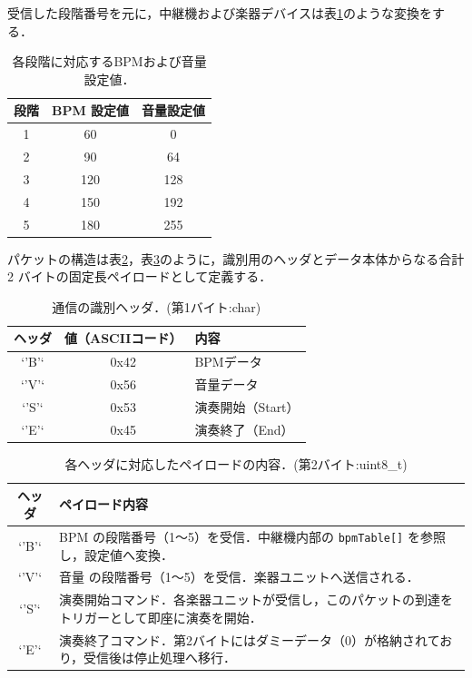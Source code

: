 \documentclass[uplatex,dvipdfmx]{jlreq}
\begin{document}
受信した段階番号を元に，中継機および楽器デバイスは表\ref{tab:bpm_volume}のような変換をする．
\begin{table}[H]
\centering
\caption{各段階に対応するBPMおよび音量設定値．}
\label{tab:bpm_volume}
\begin{tabular}{c|c|c}
\hline
段階 & BPM 設定値 & 音量設定値 \\ \hline
1 & 60 & 0 \\ \hline
2 & 90 & 64 \\ \hline
3 & 120 & 128 \\ \hline
4 & 150 & 192 \\ \hline
5 & 180 & 255 \\ \hline
\end{tabular}
\end{table}

パケットの構造は表\ref{tab:hed}，表\ref{tab:payload}のように，識別用のヘッダとデータ本体からなる合計2 バイトの固定長ペイロードとして定義する．
\begin{table}[H]
\centering
\caption{通信の識別ヘッダ．(第1バイト:char)}
\label{tab:hed}
\begin{tabular}{c|c|l}
\hline
ヘッダ & 値（ASCIIコード） & 内容 \\ \hline
`'B'` & 0x42 & BPMデータ \\ \hline
`'V'` & 0x56 & 音量データ \\ \hline
`'S'` & 0x53 & 演奏開始（Start） \\ \hline
`'E'` & 0x45 & 演奏終了（End） \\ \hline
\end{tabular}
\end{table}

\begin{table}[H]
\centering
\caption{各ヘッダに対応したペイロードの内容．(第2バイト:uint8\_t)}
\label{tab:payload}
\begin{tabular}{c|l}
\hline
ヘッダ & ペイロード内容 \\ \hline
`'B'` & BPM の段階番号（1～5）を受信．中継機内部の \texttt{bpmTable[]} を参照し，設定値へ変換． \\ \hline
`'V'` & 音量 の段階番号（1～5）を受信．楽器ユニットへ送信される． \\ \hline
`'S'` & 演奏開始コマンド．各楽器ユニットが受信し，このパケットの到達をトリガーとして即座に演奏を開始． \\ \hline
`'E'` & 演奏終了コマンド．第2バイトにはダミーデータ（0）が格納されており，受信後は停止処理へ移行． \\ \hline
\end{tabular}
\end{table}
\end{document}
